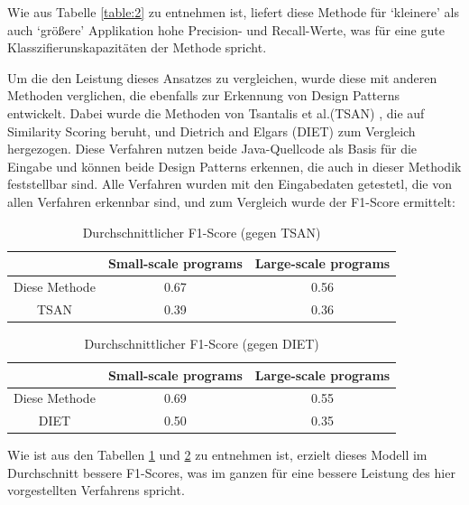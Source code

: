 \documentclass[conference]{IEEEtran}
\begin{document}
Wie aus Tabelle \ref{table:2} zu entnehmen ist, liefert diese Methode für `kleinere' als auch `größere' Applikation hohe Precision- und Recall-Werte, was für eine gute Klasszifierunskapazitäten der Methode spricht.

Um die den Leistung dieses Ansatzes zu vergleichen, wurde diese mit anderen Methoden verglichen, die ebenfalls zur Erkennung von Design Patterns entwickelt.
Dabei wurde die Methoden von Tsantalis et al.(TSAN) \cite{4015512}, die auf Similarity Scoring beruht, und Dietrich and Elgars (DIET)\cite{DIETRICH2007108} zum Vergleich hergezogen. Diese Verfahren nutzen beide Java-Quellcode als Basis für die Eingabe und können beide Design Patterns erkennen, die auch in dieser Methodik feststellbar sind.
Alle Verfahren wurden mit den Eingabedaten getestetl, die von allen Verfahren erkennbar sind, und zum Vergleich wurde der F1-Score ermittelt:

\begin{table}[h]
    \centering
    \caption{Durchschnittlicher F1-Score (gegen TSAN)}
    \label{table:3}
    \begin{tabular}{|c|c|c|}
        \hline
                      & Small-scale programs & Large-scale programs \\
        \hline
        Diese Methode & 0.67                 & 0.56                 \\
        \hline
        TSAN          & 0.39                 & 0.36                 \\
        \hline
    \end{tabular}
\end{table}

\begin{table}[h]
    \centering
    \caption{Durchschnittlicher F1-Score (gegen DIET)}
    \label{table:4}
    \begin{tabular}{|c|c|c|}
        \hline
                      & Small-scale programs & Large-scale programs \\
        \hline
        Diese Methode & 0.69                 & 0.55                 \\
        \hline
        DIET          & 0.50                 & 0.35                 \\
        \hline
    \end{tabular}
\end{table}

Wie ist aus den Tabellen \ref{table:3} und \ref{table:4} zu entnehmen ist, erzielt dieses Modell im Durchschnitt bessere F1-Scores, was im ganzen für eine bessere Leistung des hier vorgestellten Verfahrens spricht.
\end{document}
